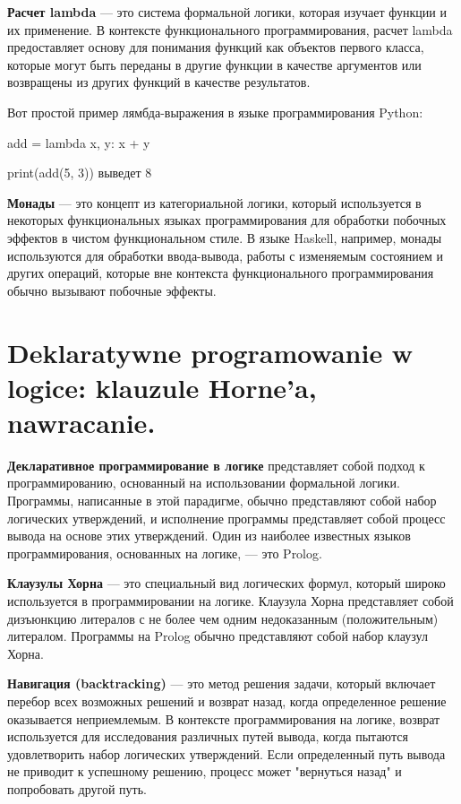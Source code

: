\textbf{Расчет lambda} — это система формальной логики, которая изучает функции и их применение. В контексте функционального программирования, расчет lambda предоставляет основу для понимания функций как объектов первого класса, которые могут быть переданы в другие функции в качестве аргументов или возвращены из других функций в качестве результатов.

Вот простой пример лямбда-выражения в языке программирования Python:

add = lambda x, y: x + y

print(add(5, 3))  выведет 8 

\textbf{Монады} — это концепт из категориальной логики, который используется в некоторых функциональных языках программирования для обработки побочных эффектов в чистом функциональном стиле. В языке Haskell, например, монады используются для обработки ввода-вывода, работы с изменяемым состоянием и других операций, которые вне контекста функционального программирования обычно вызывают побочные эффекты.

\section{Deklaratywne programowanie w logice: klauzule Horne'a, nawracanie.}


\textbf{Декларативное программирование в логике} представляет собой подход к программированию, основанный на использовании формальной логики. Программы, написанные в этой парадигме, обычно представляют собой набор логических утверждений, и исполнение программы представляет собой процесс вывода на основе этих утверждений. Один из наиболее известных языков программирования, основанных на логике, — это Prolog.

\textbf{Клаузулы Хорна} — это специальный вид логических формул, который широко используется в программировании на логике. Клаузула Хорна представляет собой дизъюнкцию литералов с не более чем одним недоказанным (положительным) литералом. Программы на Prolog обычно представляют собой набор клаузул Хорна.

\textbf{Навигация (backtracking)} — это метод решения задачи, который включает перебор всех возможных решений и возврат назад, когда определенное решение оказывается неприемлемым. В контексте программирования на логике, возврат используется для исследования различных путей вывода, когда пытаются удовлетворить набор логических утверждений. Если определенный путь вывода не приводит к успешному решению, процесс может "вернуться назад" и попробовать другой путь.
